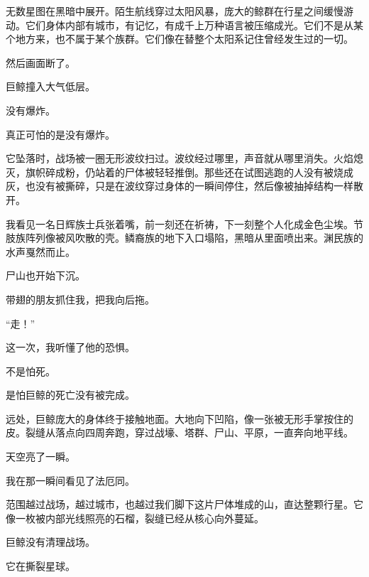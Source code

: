 无数星图在黑暗中展开。陌生航线穿过太阳风暴，庞大的鲸群在行星之间缓慢游动。它们身体内部有城市，有记忆，有成千上万种语言被压缩成光。它们不是从某个地方来，也不属于某个族群。它们像在替整个太阳系记住曾经发生过的一切。

然后画面断了。

巨鲸撞入大气低层。

没有爆炸。

真正可怕的是没有爆炸。

它坠落时，战场被一圈无形波纹扫过。波纹经过哪里，声音就从哪里消失。火焰熄灭，旗帜碎成粉，仍站着的尸体被轻轻推倒。那些还在试图逃跑的人没有被烧成灰，也没有被撕碎，只是在波纹穿过身体的一瞬间停住，然后像被抽掉结构一样散开。

我看见一名日辉族士兵张着嘴，前一刻还在祈祷，下一刻整个人化成金色尘埃。节肢族阵列像被风吹散的壳。鳞裔族的地下入口塌陷，黑暗从里面喷出来。渊民族的水声戛然而止。

尸山也开始下沉。

带翅的朋友抓住我，把我向后拖。

“走！”

这一次，我听懂了他的恐惧。

不是怕死。

是怕巨鲸的死亡没有被完成。

远处，巨鲸庞大的身体终于接触地面。大地向下凹陷，像一张被无形手掌按住的皮。裂缝从落点向四周奔跑，穿过战壕、塔群、尸山、平原，一直奔向地平线。

天空亮了一瞬。

我在那一瞬间看见了法厄同。

范围越过战场，越过城市，也越过我们脚下这片尸体堆成的山，直达整颗行星。它像一枚被内部光线照亮的石榴，裂缝已经从核心向外蔓延。

巨鲸没有清理战场。

它在撕裂星球。
